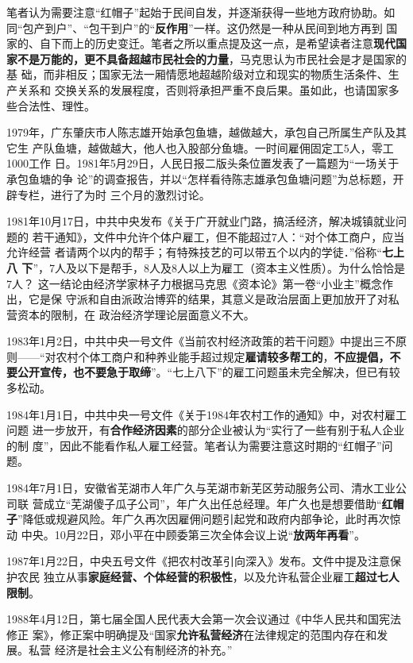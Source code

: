 笔者认为需要注意“红帽子”起始于民间自发，并逐渐获得一些地方政府协助。如
同“包产到户”、“包干到户”的“\textbf{反作用}”一样。这仍然是一种从民间到地方再到
国家的、自下而上的历史变迁。笔者之所以重点提及这一点，是希望读者注意\textbf{现代国
  家不是万能的，更不具备超越市民社会的力量}，马克思认为市民社会是才是国家的基
础，而非相反；国家无法一厢情愿地超越阶级对立和现实的物质生活条件、生产关系和
交换关系的发展程度，否则将承担严重不良后果。虽如此，也请国家多些合法性、理性。


1979年，广东肇庆市人陈志雄开始承包鱼塘，越做越大，承包自己所属生产队及其它生
产队鱼塘，越做越大，他人也入股部分鱼塘。一时间雇佣固定工5人，零工1000工作
日。1981年5月29日，人民日报二版头条位置发表了一篇题为“一场关于承包鱼塘的争
论”的调查报告，并以“怎样看待陈志雄承包鱼塘问题”为总标题，开辟专栏，进行了为时
三个月的激烈讨论。

1981年10月17日，中共中央发布《关于广开就业门路，搞活经济，解决城镇就业问题的
若干通知》，文件中允许个体户雇工，但不能超过7人：“对个体工商户，应当允许经营
者请两个以内的帮手；有特殊技艺的可以带五个以内的学徒．”俗称“\textbf{七上八
  下}”，7人及以下是帮手，8人及8人以上为雇工（资本主义性质）。为什么恰恰是7人？
这一结论由经济学家林子力根据马克思《资本论》第一卷“小业主”概念作出，它是保
守派和自由派政治博弈的结果，其意义是政治层面上更加放开了对私营资本的限制，在
政治经济学理论层面意义不大。

1983年1月2日，中共中央一号文件《当前农村经济政策的若干问题》中提出三不原
则——“对农村个体工商户和种养业能手超过规定\textbf{雇请较多帮工的}，\textbf{不应提倡，不
  要公开宣传，也不要急于取缔}”。“七上八下”的雇工问题虽未完全解决，但已有较
多松动。

1984年1月1日，中共中央一号文件《关于1984年农村工作的通知》中，对农村雇工问题
进一步放开，有\textbf{合作经济因素}的部分企业被认为“实行了一些有别于私人企业的制
度”，因此不能看作私人雇工经营。笔者认为需要注意这时期的“红帽子”问题。

1984年7月1日，安徽省芜湖市人年广久与芜湖市新芜区劳动服务公司、清水工业公司联
营成立“芜湖傻子瓜子公司”，年广久出任总经理。年广久也是想要借助“\textbf{红帽
  子}”降低或规避风险。年广久再次因雇佣问题引起党和政府内部争论，此时再次惊动
中央。10月22日，邓小平在中顾委第三次全体会议上说“\textbf{放两年再看}”。

1987年1月22日，中央五号文件《把农村改革引向深入》发布。文件中提及注意保护农民
独立从事\textbf{家庭经营、个体经营的积极性}，以及允许私营企业雇工\textbf{超过七人限制}。

1988年4月12日，第七届全国人民代表大会第一次会议通过《中华人民共和国宪法修正
案》，修正案中明确提及“国家\textbf{允许私营经济}在法律规定的范围内存在和发展。私营
经济是社会主义公有制经济的补充。”

